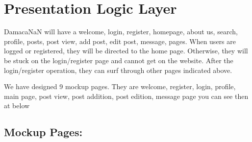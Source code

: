 \section{Presentation Logic Layer}


\hspace{5mm}DamacaNaN will have a welcome, login, register, homepage, about us, search, profile, posts, post view, add post, edit post, message, pages. When users are logged or registered, they will be directed to the home page. Otherwise, they will be stuck on the login/register page and cannot get on the website. After the login/register operation, they can surf through other pages indicated above. \newline


We have designed 9 mockup pages. They are welcome, register, login, profile, main page, post view, post addition, post edition, message page you can see then at below 
\subsection{Mockup Pages:}


